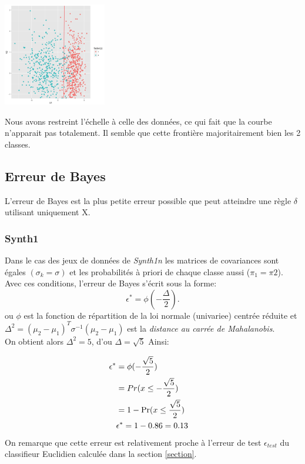 \documentclass[10pt]{article}
\begin{document}
\begin{center}
	\includegraphics[width=45mm]{Figures/Exo2/curve_synth2.png}
	\label{fig:front1_synth2}
\end{center}%
\hspace{0.02\linewidth}

\vspace{1mm}
Nous avons restreint l'échelle  à celle des données, ce qui fait que la courbe n'apparait pas totalement. Il semble que cette frontière majoritairement bien les 2 classes.

\subsection{Erreur de Bayes}
L'erreur de Bayes est la plus petite erreur possible que peut atteindre une règle $\delta$ utilisant uniquement X. 
\subsubsection{Synth1}
Dans le cas des jeux de données de \textit{Synth1n} les matrices de covariances sont égales $(\sigma_{k} = \sigma)$ et les probabilités à priori de chaque classe aussi  ($\pi_{1} = \pi{2}$). Avec ces conditions, l'erreur de Bayes s'écrit sous la forme: \[ \epsilon^{*} = \phi(-\frac{\Delta}{2}) . \]
ou $\phi$ est la fonction de répartition de la loi normale (univariee) centrée réduite  et $ \Delta^{2}   = (\mu_{2} - \mu_{1})^{T} \sigma^{-1} (\mu_{2}  - \mu_{1})$ est la \textit{distance au carrée de Mahalanobis}.\\
On obtient alors $\Delta^{2} = 5$, d'ou $\Delta = \sqrt{5} $ Ainsi: 

\begin{align}
 \epsilon^{*}  &=  \phi(-\frac{\sqrt{5}}{2}) \cr
& =  Pr(x \leq -\frac{\sqrt{5}}{2}) \cr
 &= 1 - \Pr(x \leq \frac{\sqrt{5}}{2})\cr
 & \epsilon^{*} = 1 - 0.86 = 0.13 \cr
\end{align}
On remarque  que cette erreur est relativement proche à l'erreur de test $\epsilon_{test}$ du classifieur Euclidien calculée dans la section \ref{section}. 
\end{document}
